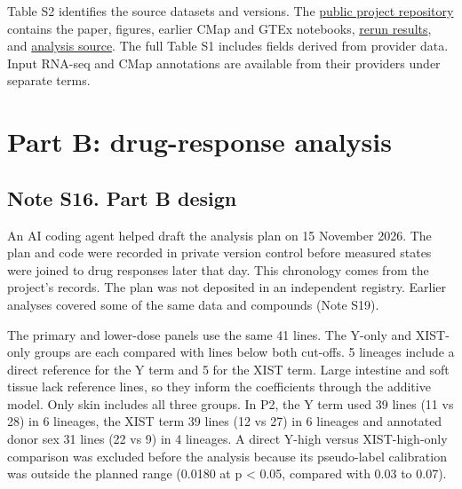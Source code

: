 \documentclass[
  11pt,
  letterpaper,
]{article}
\begin{document}
Table S2 identifies the source datasets and versions. The
\href{https://github.com/MateenahJAHAN/Project-59-CMAP-Sex-Differences\#readme}{public
project repository} contains the paper, figures, earlier CMap and GTEx
notebooks,
\href{https://github.com/MateenahJAHAN/Project-59-CMAP-Sex-Differences/tree/main/verification}{rerun
results}, and
\href{https://github.com/MateenahJAHAN/Project-59-CMAP-Sex-Differences/tree/main/analysis}{analysis
source}. The full Table S1 includes fields derived from provider data.
Input RNA-seq and CMap annotations are available from their providers
under separate terms.

\section{Part B: drug-response
analysis}\label{part-b-drug-response-analysis}

\subsection{Note S16. Part B design}\label{note-s16.-part-b-design}

An AI coding agent helped draft the analysis plan on 15 November 2026.
The plan and code were recorded in private version control before
measured states were joined to drug responses later that day. This
chronology comes from the project's records. The plan was not deposited
in an independent registry. Earlier analyses covered some of the same
data and compounds (Note S19).

The primary and lower-dose panels use the same 41 lines. The Y-only and
XIST-only groups are each compared with lines below both cut-offs. 5
lineages include a direct reference for the Y term and 5 for the XIST
term. Large intestine and soft tissue lack reference lines, so they
inform the coefficients through the additive model. Only skin includes
all three groups. In P2, the Y term used 39 lines (11 vs 28) in 6
lineages, the XIST term 39 lines (12 vs 27) in 6 lineages and annotated
donor sex 31 lines (22 vs 9) in 4 lineages. A direct Y-high versus
XIST-high-only comparison was excluded before the analysis because its
pseudo-label calibration was outside the planned range (0.0180 at p
\textless{} 0.05, compared with 0.03 to 0.07).
\end{document}
